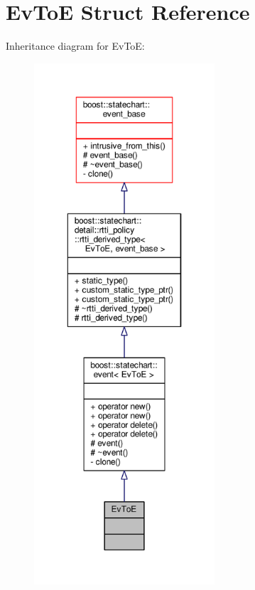 \hypertarget{struct_ev_to_e}{}\section{Ev\+ToE Struct Reference}
\label{struct_ev_to_e}


Inheritance diagram for Ev\+ToE\+:
\nopagebreak
\begin{figure}[H]
\begin{center}
\leavevmode
\includegraphics[height=550pt]{struct_ev_to_e__inherit__graph}
\end{center}
\end{figure}


